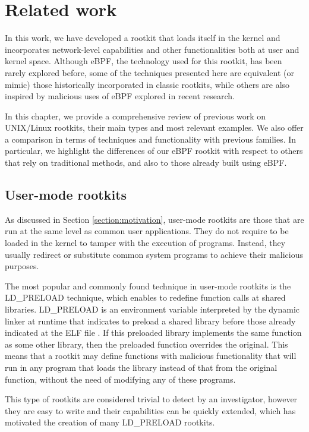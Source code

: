 \chapter{Related work} \label{chapter:related_work}
In this work, we have developed a rootkit that loads itself in the kernel
and incorporates network-level capabilities and other functionalities both
at user and kernel space. Although eBPF, the technology used for this
rootkit, has been rarely explored before, some of the techniques presented
here are equivalent (or mimic) those historically incorporated in classic
rootkits, while others are also inspired by malicious uses of eBPF explored
in recent research. 

In this chapter, we provide a comprehensive review of previous
work on UNIX/Linux rootkits, their main types and most relevant examples.
We also offer a comparison in terms of techniques and functionality with
previous families. In particular, we highlight the differences of our
eBPF rootkit with respect to others that rely on traditional methods,
and also to those already built using eBPF.

\section{User-mode rootkits}
As discussed in Section \ref{section:motivation}, user-mode rootkits
are those that are run at the same level as common user applications. They
do not require to be loaded in the kernel to tamper with the execution of
programs. Instead, they usually redirect or substitute common system
programs to achieve their malicious purposes.

The most popular and commonly found technique in user-mode rootkits is the
LD\_PRELOAD technique, which enables to redefine function calls at shared
libraries. LD\_PRELOAD is an environment variable interpreted by the
dynamic linker at runtime that indicates to preload a shared library
before those already indicated at the ELF file \cite{ldpreload_pros}. If
this preloaded library implements the same function as some other library,
then the preloaded function overrides the original. This means that a
rootkit may define functions with malicious functionality that will run in
any program that loads the library instead of that from the original
function, without the need of modifying any of these programs.

This type of rootkits are considered trivial to detect by an investigator,
however they are easy to write and their capabilities can be quickly
extended, which has motivated the creation of many LD\_PRELOAD rootkits.

